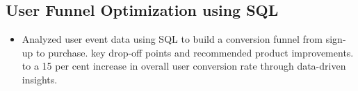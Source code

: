 \documentclass[11pt]{article}
\begin{document}
\subsection{User Funnel Optimization using SQL}
\begin{itemize}
  \item Analyzed user event data using SQL to build a conversion funnel from sign-up to
purchase.
  \itemIdentified key drop-off points and recommended product improvements.
  \itemContributed to a 15 per cent increase in overall user conversion rate through data-driven
insights.
\end{itemize}
\end{document}
